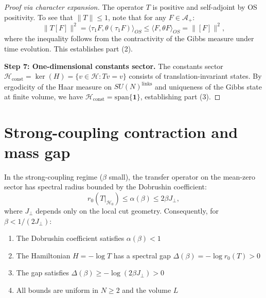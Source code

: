 \documentclass[11pt]{amsart}
\begin{document}
\begin{proof}[Proof via character expansion]
The operator $T$ is positive and self-adjoint by OS positivity. To see that $\|T\| \le 1$, note that for any $F \in \mathcal{A}_+$:
\[
  \|T[F]\|^2 = \langle \tau_1 F, \theta(\tau_1 F) \rangle_{OS} \le \langle F, \theta F \rangle_{OS} = \|[F]\|^2,
\]
where the inequality follows from the contractivity of the Gibbs measure under time evolution. This establishes part (2).

\textbf{Step 7: One-dimensional constants sector.}
The constants sector $\mathcal{H}_{\text{const}} = \ker(H) = \{v \in \mathcal{H} : Tv = v\}$ consists of translation-invariant states. By ergodicity of the Haar measure on $SU(N)^{\text{links}}$ and uniqueness of the Gibbs state at finite volume, we have $\mathcal{H}_{\text{const}} = \text{span}\{\mathbf{1}\}$, establishing part (3).
\end{proof}

\section{Strong-coupling contraction and mass gap}

\begin{theorem}\label{thm:dobrushin-contraction}
In the strong-coupling regime ($\beta$ small), the transfer operator on the mean-zero sector has spectral radius bounded by the Dobrushin coefficient:
\[
  r_0(T|_{\mathcal{H}_0}) \le \alpha(\beta) \le 2\beta J_{\perp},
\]
where $J_{\perp}$ depends only on the local cut geometry. Consequently, for $\beta < 1/(2J_{\perp})$:
\begin{enumerate}
  \item The Dobrushin coefficient satisfies $\alpha(\beta) < 1$
  \item The Hamiltonian $H = -\log T$ has a spectral gap $\Delta(\beta) = -\log r_0(T) > 0$
  \item The gap satisfies $\Delta(\beta) \ge -\log(2\beta J_{\perp}) > 0$
  \item All bounds are uniform in $N \ge 2$ and the volume $L$
\end{enumerate}
\end{theorem}
\end{document}
